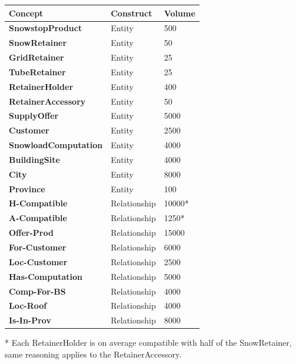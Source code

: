 \documentclass{article}[h]
\begin{document}
\begin{table}[H]
  \def\arraystretch{1.25}%
  \centering
  \begin{tabular}{ | m{4.5cm} | m{4.5cm}| m{4.5cm} |}  
    \hline
    {\textbf{\large Concept}} & {\textbf{\large Construct}} & {\textbf{\large Volume}} \\ 
    \hline
    \color[HTML]{3531FF} \textbf{SnowstopProduct} & Entity & 500  \\ 
    \hline
    \color[HTML]{3531FF} \textbf{SnowRetainer} & Entity & 50 \\  
    \hline
    \color[HTML]{3531FF} \textbf{GridRetainer} & Entity & 25 \\ 
    \hline
    \color[HTML]{3531FF} \textbf{TubeRetainer} & Entity & 25 \\ 
    \hline
    \color[HTML]{3531FF} \textbf{RetainerHolder} & Entity & 400 \\ 
    \hline
    \color[HTML]{3531FF} \textbf{RetainerAccessory} & Entity & 50 \\ 
    \hline
    \color[HTML]{3531FF} \textbf{SupplyOffer} & Entity & 5000\\  
    \hline
    \color[HTML]{3531FF} \textbf{Customer} & Entity & 2500\\ 
    \hline
    \color[HTML]{3531FF} \textbf{SnowloadComputation} & Entity & 4000\\  
    \hline
    \color[HTML]{3531FF} \textbf{BuildingSite} & Entity & 4000\\ 
    \hline
    \color[HTML]{3531FF} \textbf{City} & Entity & 8000 \\ 
    \hline
    \color[HTML]{3531FF} \textbf{Province} & Entity & 100 \\ 
    \hline
    \color[HTML]{3531FF} \textbf{H-Compatible} & Relationship & 10000* \\ 
    \hline
    \color[HTML]{3531FF} \textbf{A-Compatible} & Relationship & 1250* \\ 
    \hline
    \color[HTML]{3531FF} \textbf{Offer-Prod} & Relationship & 15000\\ 
    \hline
    \color[HTML]{3531FF} \textbf{For-Customer} & Relationship & 6000\\ 
    \hline
    \color[HTML]{3531FF} \textbf{Loc-Customer} & Relationship & 2500\\ 
    \hline
    \color[HTML]{3531FF} \textbf{Has-Computation} & Relationship & 5000\\ 
    \hline
    \color[HTML]{3531FF} \textbf{Comp-For-BS} & Relationship & 4000\\ 
    \hline
    \color[HTML]{3531FF} \textbf{Loc-Roof} & Relationship & 4000\\ 
    \hline
    \color[HTML]{3531FF} \textbf{Is-In-Prov} & Relationship & 8000 \\ 
    \hline
  \end{tabular}
\end{table}
\small{* Each RetainerHolder is on average compatible with half of the SnowRetainer, same reasoning applies to the RetainerAccessory.}
\end{document}
